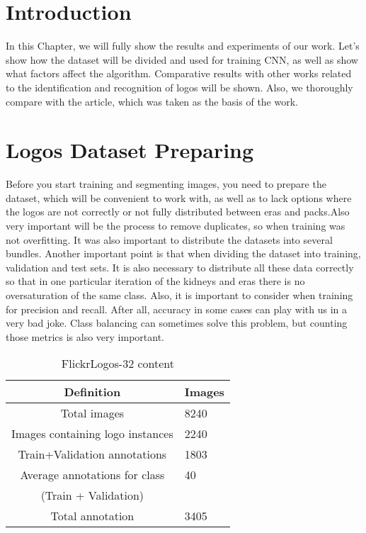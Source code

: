 \section{Introduction}\label{sec:5.1}
\vspace{-0.5cm}
\noindent In this Chapter, we will fully show the results and experiments of our work. Let's show how the dataset will be divided and used for training CNN, as well as show what factors affect the algorithm. Comparative results with other works related to the identification and recognition of logos will be shown. Also, we thoroughly compare with the article, which was taken as the basis of the work.

\vspace{-0.3cm}

\section{Logos Dataset Preparing}\label{sec:5.2}
\vspace{-0.5cm}
\noindent Before you start training and segmenting images, you need to prepare the dataset, which will be convenient to work with, as well as to lack options where the logos are not correctly or not fully distributed between eras and packs.Also very important will be the process to remove duplicates, so when training was not overfitting. It was also important to distribute the datasets into several bundles. Another important point is that when dividing the dataset into training, validation and test sets. It is also necessary to distribute all these data correctly so that in one particular iteration of the kidneys and eras there is no oversaturation of the same class. Also, it is important to consider when training for precision and recall. After all, accuracy in some cases can play with us in a very bad joke. Class balancing can sometimes solve this problem, but counting those metrics is also very important.

\begin{table}[hbp]
	\centering
	\caption{FlickrLogos-32 content}
	\label{tab:sample}
	\begin{tabular}{cl}
		\toprule
		Definition		 					&		Images 	\\ \midrule
		Total images  	 					& 		8240   	\\
		Images containing logo instances	&		2240   	\\
		Train+Validation annotations		&		1803	\\
		Average annotations for class		&		40		\\
			(Train + Validation)			& 				\\
		Total annotation					& 		3405	\\
		\bottomrule
	\end{tabular}
\end{table}

